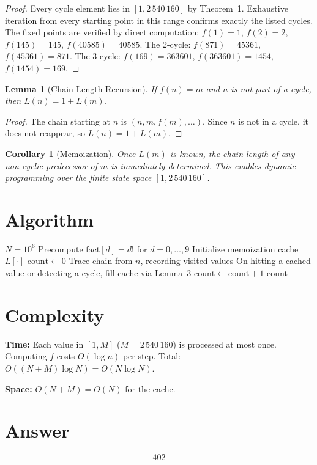 \documentclass[12pt,a4paper]{article}
\newtheorem{lemma}[theorem]{Lemma}
\newtheorem{corollary}[theorem]{Corollary}
\theoremstyle{definition}
\begin{document}
\begin{proof}
Every cycle element lies in $[1, 2\,540\,160]$ by Theorem~1. Exhaustive iteration from every starting point in this range confirms exactly the listed cycles. The fixed points are verified by direct computation: $f(1) = 1$, $f(2) = 2$, $f(145) = 145$, $f(40585) = 40585$. The 2-cycle: $f(871) = 45361$, $f(45361) = 871$. The 3-cycle: $f(169) = 363601$, $f(363601) = 1454$, $f(1454) = 169$.
\end{proof}

\begin{lemma}[Chain Length Recursion]
If $f(n) = m$ and $n$ is not part of a cycle, then $L(n) = 1 + L(m)$.
\end{lemma}

\begin{proof}
The chain starting at $n$ is $(n, m, f(m), \ldots)$. Since $n$ is not in a cycle, it does not reappear, so $L(n) = 1 + L(m)$.
\end{proof}

\begin{corollary}[Memoization]
Once $L(m)$ is known, the chain length of any non-cyclic predecessor of $m$ is immediately determined. This enables dynamic programming over the finite state space $[1, 2\,540\,160]$.
\end{corollary}

\section{Algorithm}

\begin{algorithm}[H]
\caption{Count chains of length 60}
\begin{algorithmic}[1]
\Require $N = 10^6$
\State Precompute $\mathrm{fact}[d] = d!$ for $d = 0, \ldots, 9$
\State Initialize memoization cache $L[\cdot]$
\State $\mathrm{count} \gets 0$
    \State Trace chain from $n$, recording visited values
    \State On hitting a cached value or detecting a cycle, fill cache via Lemma~3
        \State $\mathrm{count} \gets \mathrm{count} + 1$
    \EndIf
\EndFor
\State \Return count
\end{algorithmic}
\end{algorithm}

\section{Complexity}

\textbf{Time:} Each value in $[1, M]$ ($M = 2\,540\,160$) is processed at most once. Computing $f$ costs $O(\log n)$ per step. Total: $O((N + M) \log N) = O(N \log N)$.

\textbf{Space:} $O(N + M) = O(N)$ for the cache.

\section{Answer}

\[
\boxed{402}
\]
\end{document}
